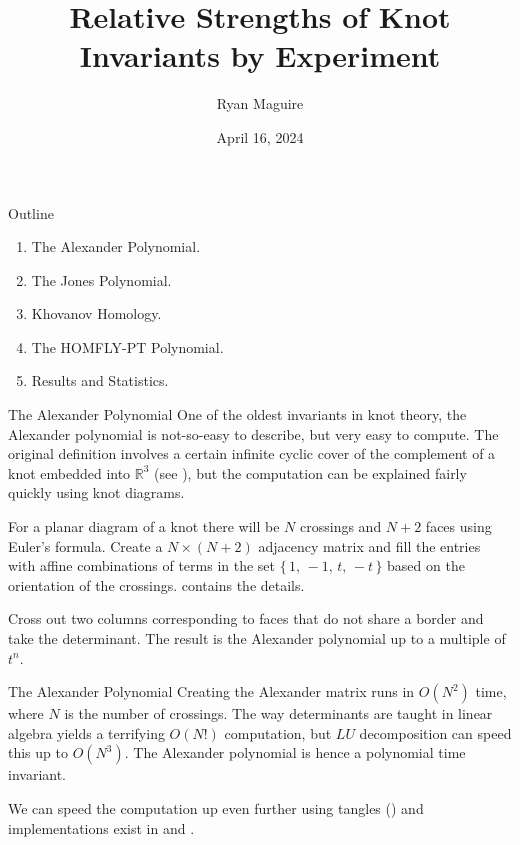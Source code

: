 \documentclass{beamer}
\title{Relative Strengths of Knot Invariants by Experiment}
\author{Ryan Maguire}
\date{April 16, 2024}
\begin{document}
    \maketitle
    \begin{frame}{Outline}
        \begin{enumerate}
            \item The Alexander Polynomial.
            \item The Jones Polynomial.
            \item Khovanov Homology.
            \item The HOMFLY-PT Polynomial.
            \item Results and Statistics.
        \end{enumerate}
    \end{frame}
    \begin{frame}{The Alexander Polynomial}
        One of the oldest invariants in knot theory, the Alexander polynomial
        is not-so-easy to describe, but very easy to compute. The original
        definition involves a certain infinite cyclic cover of the complement
        of a knot embedded into $\mathbb{R}^{3}$
        (see \cite[p.~53]{LickorishKnotTheory}), but the
        computation can be explained fairly quickly using knot diagrams.
        \par\hfill\par
        For a planar diagram of a knot there will be $N$ crossings and
        $N+2$ faces using Euler's formula. Create a $N\times(N+2)$ adjacency
        matrix and fill the entries with affine combinations of terms in the
        set $\{\,1,\,-1,\,t,\,-t\,\}$ based on the orientation of the crossings.
        \cite[p.~49]{LivingstonKnotTheory} contains the details.
        \par\hfill\par
        Cross out two columns corresponding to faces that do not share a
        border and take the determinant. The result is the Alexander polynomial
        up to a multiple of $t^{n}$.
    \end{frame}
    \begin{frame}{The Alexander Polynomial}
        Creating the Alexander matrix runs in $O(N^{2})$ time, where $N$
        is the number of crossings. The way determinants are taught in
        linear algebra yields a terrifying $O(N!)$ computation, but $LU$
        decomposition can speed this up to $O(N^3)$. The Alexander polynomial
        is hence a polynomial time invariant.
        \par\hfill\par
        We can speed the computation up even further using tangles
        (\cite{BarNatanPolynomialTimeKnotPolynomials}) and implementations
        exist in \cite{SnapPy} and \cite{MaguireLibtmpl}.
    \end{frame}
\end{document}
